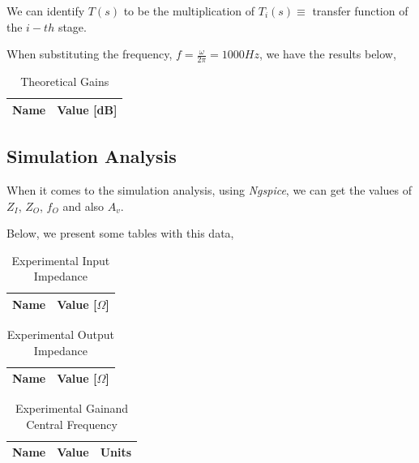 We can identify $T(s)$ to be the multiplication of $T_i(s)\equiv$ transfer function of the $i-th$ stage. 

When substituting the frequency, $f=\frac{\omega}{2\pi}= 1000 Hz$, we have the results below,

\begin{table}[h]
    \centering
    \begin{tabular}{|l|c|}
    \hline
    {\bf Name} & {\bf Value [dB]} \\ \hline
    
   \end{tabular}
   \caption{Theoretical Gains}
   \label{tab:theo_gain}
\end{table}

\pagebreak

\subsection{Simulation Analysis}
\label{subsec:sim_analysis}

When it comes to the simulation analysis, using \textit{Ngspice}, we can get the values of $Z_I$, $Z_O$, $f_O$ and also $A_v$.

Below, we present some tables with this data,

\begin{table}[h]
    \centering
    \begin{tabular}{|l|c|}
    \hline
    {\bf Name} & {\bf Value [$\Omega$]} \\ \hline
    
    \end{tabular}
   \caption{Experimental Input Impedance}
   \label{tab:exp_in_imp}
\end{table}
\begin{table}[h]
    \centering
    \begin{tabular}{|l|c|}
    \hline
    {\bf Name} & {\bf Value [$\Omega$]} \\ \hline
    
    \end{tabular}
   \caption{Experimental Output Impedance}
   \label{tab:exp_out_imp}
\end{table}
\begin{table}[h]
    \centering
    \begin{tabular}{|l|c|c|}
    \hline
    {\bf Name} & {\bf Value} & {\bf Units}\\ \hline
    
    \end{tabular}
   \caption[Experimental Gain and Central Frequency]{Experimental Gain\footnotemark and Central Frequency}
   \label{tab:exp_gain_freq}
\end{table}

